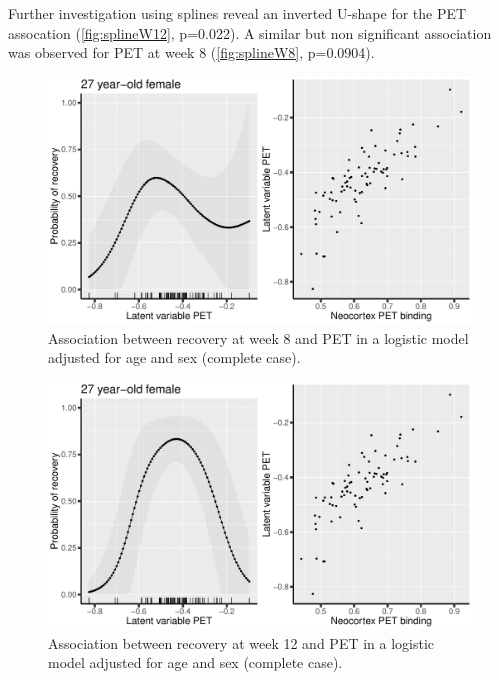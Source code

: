 \documentclass[12pt]{article}
\begin{document}
\vfill

Further investigation using splines reveal an inverted U-shape for the
PET assocation (\autoref{fig:splineW12}, p=0.022). A similar but non
significant association was observed for PET at week 8 (\autoref{fig:splineW8},
p=0.0904).
\vfill

\begin{figure}[!h]
\centering
\includegraphics[trim={0 0 0 0},width=\textwidth]{./../figures/gg-spline-w8.pdf}
\caption{\label{fig:splineW8}Association between recovery at week 8 and PET in a logistic model adjusted for age and sex (complete case).}
\end{figure}

\clearpage

\begin{figure}[!h]
\centering
\includegraphics[trim={0 0 0 0},width=\textwidth]{./../figures/gg-spline-w12.pdf}
\caption{\label{fig:splineW12}Association between recovery at week 12 and PET in a logistic model adjusted for age and sex (complete case).}
\end{figure}
\end{document}

